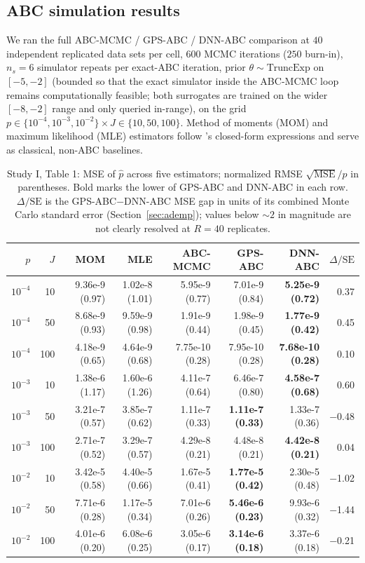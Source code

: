 \documentclass[sn-basic,iicol,pdflatex]{sn-jnl}
\begin{document}
\subsection{ABC simulation results}
\label{sec:sim1D_results}

We ran the full ABC-MCMC / GPS-ABC / DNN-ABC comparison at $40$ independent
replicated data sets per cell, $600$ MCMC iterations ($250$ burn-in), $n_s=6$
simulator repeats per exact-ABC iteration, prior $\theta \sim
\mathrm{TruncExp}$ on $[-5,-2]$ (bounded so that the exact simulator inside
the ABC-MCMC loop remains computationally feasible; both surrogates are
trained on the wider $[-8,-2]$ range and only queried in-range), on the grid
$p \in \{10^{-4}, 10^{-3}, 10^{-2}\} \times J \in \{10, 50, 100\}$. Method of
moments (MOM) and maximum likelihood (MLE) estimators follow \citeauthor{lu2023}'s
closed-form expressions and serve as classical, non-ABC baselines.

\begin{table}[t]
\centering
\caption{Study I, Table 1: MSE of $\hat p$ across five estimators; normalized
RMSE $\sqrt{\mathrm{MSE}}/p$ in parentheses. Bold marks the lower of GPS-ABC
and DNN-ABC in each row. $\Delta/\mathrm{SE}$ is the GPS-ABC$-$DNN-ABC MSE gap
in units of its combined Monte Carlo standard error (Section~\ref{sec:ademp});
values below $\sim 2$ in magnitude are not clearly resolved at $R=40$
replicates.}
\label{tab:mse1D}
{\small
\begin{tabular}{rrrrrrrr}
\toprule
$p$ & $J$ & MOM & MLE & ABC-MCMC & GPS-ABC & DNN-ABC & $\Delta/\mathrm{SE}$ \\
\midrule
$10^{-4}$ & 10  & 9.36e-9 (0.97) & 1.02e-8 (1.01) & 5.95e-9 (0.77) & 7.01e-9 (0.84) & \textbf{5.25e-9 (0.72)} & 0.37 \\
$10^{-4}$ & 50  & 8.68e-9 (0.93) & 9.59e-9 (0.98) & 1.91e-9 (0.44) & 1.98e-9 (0.45) & \textbf{1.77e-9 (0.42)} & 0.45 \\
$10^{-4}$ & 100 & 4.18e-9 (0.65) & 4.64e-9 (0.68) & 7.75e-10 (0.28) & 7.95e-10 (0.28) & \textbf{7.68e-10 (0.28)} & 0.10 \\
$10^{-3}$ & 10  & 1.38e-6 (1.17) & 1.60e-6 (1.26) & 4.11e-7 (0.64) & 6.46e-7 (0.80) & \textbf{4.58e-7 (0.68)} & 0.60 \\
$10^{-3}$ & 50  & 3.21e-7 (0.57) & 3.85e-7 (0.62) & 1.11e-7 (0.33) & \textbf{1.11e-7 (0.33)} & 1.33e-7 (0.36) & $-$0.48 \\
$10^{-3}$ & 100 & 2.71e-7 (0.52) & 3.29e-7 (0.57) & 4.29e-8 (0.21) & 4.48e-8 (0.21) & \textbf{4.42e-8 (0.21)} & 0.04 \\
$10^{-2}$ & 10  & 3.42e-5 (0.58) & 4.40e-5 (0.66) & 1.67e-5 (0.41) & \textbf{1.77e-5 (0.42)} & 2.30e-5 (0.48) & $-$1.02 \\
$10^{-2}$ & 50  & 7.71e-6 (0.28) & 1.17e-5 (0.34) & 7.01e-6 (0.26) & \textbf{5.46e-6 (0.23)} & 9.93e-6 (0.32) & $-$1.44 \\
$10^{-2}$ & 100 & 4.01e-6 (0.20) & 6.08e-6 (0.25) & 3.05e-6 (0.17) & \textbf{3.14e-6 (0.18)} & 3.37e-6 (0.18) & $-$0.21 \\
\bottomrule
\end{tabular}}
\end{table}
\end{document}
